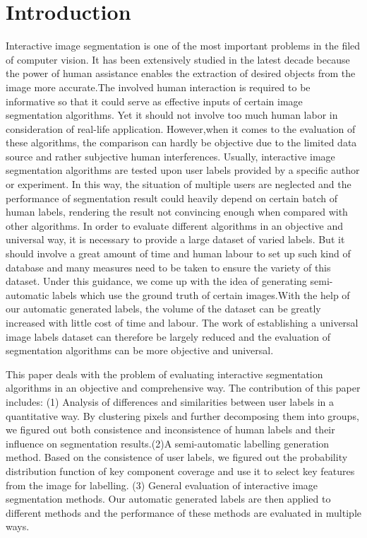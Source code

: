 \documentclass[runningheads,a4paper]{llncs}
\begin{document}
\section{Introduction}

Interactive image segmentation is one of the most important problems in the filed of computer vision. It has been extensively studied in the latest decade because the power of human assistance enables the extraction of desired objects from the image more accurate.The involved human interaction is required to be informative so that it could serve as effective inputs of certain image segmentation algorithms. Yet it should not involve too much human labor in consideration of real-life application. However,when it comes to the evaluation of these algorithms, the comparison can hardly be objective due to the limited data source and rather subjective human interferences. Usually, interactive image segmentation algorithms are tested upon user labels provided by a specific author or experiment. In this way, the situation of multiple users are neglected and the performance of segmentation result could heavily depend on certain batch of human labels, rendering the result not convincing enough when compared with other algorithms. In order to evaluate different algorithms in an objective and universal way, it is necessary to provide a large dataset of varied labels. But it should involve a great amount of time and human labour to set up such kind of database and many measures need to be taken to ensure the variety of this dataset. Under this guidance, we come up with the idea of generating semi-automatic labels which use the ground truth of certain images.With the help of our automatic generated labels, the volume of the dataset can be greatly increased with little cost of time and labour. The work of establishing a universal image labels dataset can therefore be largely reduced and the evaluation of segmentation algorithms can  be more objective and universal.

This paper deals with the problem of evaluating interactive segmentation algorithms in an objective and comprehensive way. The contribution of this paper includes: (1)  Analysis of differences and similarities between user labels in a quantitative way. By clustering pixels and further decomposing them into groups, we figured out both consistence and inconsistence of human labels and their influence on segmentation results.(2)A semi-automatic labelling generation method. Based on the consistence of user labels, we figured out the probability distribution function of key component coverage and use it to select key features from the image for labelling. (3) General evaluation of interactive image segmentation methods. Our automatic generated labels are then applied to different methods and the performance of these methods are evaluated in multiple ways.
\end{document}

